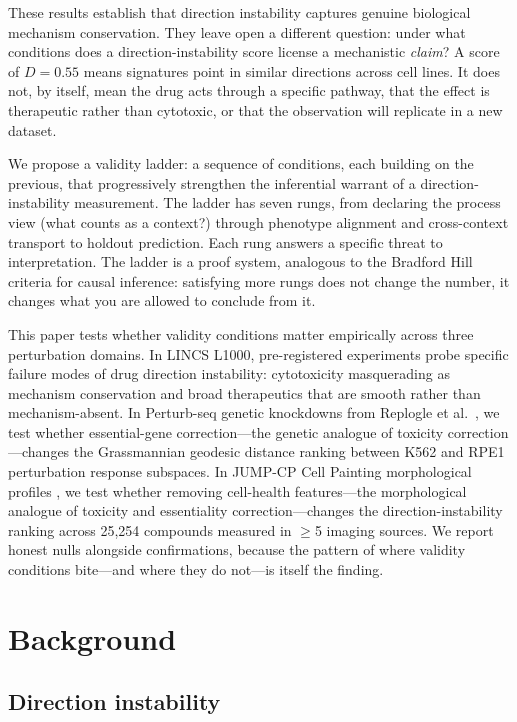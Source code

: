 \documentclass{article}
\begin{document}
These results establish that direction instability captures genuine biological
mechanism conservation. They leave open a different question: under what
conditions does a direction-instability score license a mechanistic \emph{claim}?
A score of $D = 0.55$ means signatures point in similar directions across cell
lines. It does not, by itself, mean the drug acts through a specific pathway,
that the effect is therapeutic rather than cytotoxic, or that the observation
will replicate in a new dataset.

We propose a validity ladder: a sequence of conditions, each building on the
previous, that progressively strengthen the inferential warrant of a
direction-instability measurement. The ladder has seven rungs, from declaring
the process view (what counts as a context?) through phenotype alignment and
cross-context transport to holdout prediction. Each rung answers a specific
threat to interpretation. The ladder is a proof system, analogous to the
Bradford Hill criteria for causal inference: satisfying more rungs does not
change the number, it changes what you are allowed to conclude from it.

This paper tests whether validity conditions matter empirically across three
perturbation domains. In LINCS L1000, pre-registered experiments probe
specific failure modes of drug direction instability: cytotoxicity
masquerading as mechanism conservation and broad therapeutics that are
smooth rather than mechanism-absent. In Perturb-seq genetic knockdowns from
Replogle et al.\ \citep{replogle2022mapping}, we test whether essential-gene
correction---the genetic analogue of toxicity correction---changes the
Grassmannian geodesic distance ranking between K562 and RPE1 perturbation
response subspaces. In JUMP-CP Cell Painting morphological profiles
\citep{chandrasekaran2023jump}, we test whether removing cell-health
features---the morphological analogue of toxicity and essentiality
correction---changes the direction-instability ranking across 25{,}254
compounds measured in $\geq$5 imaging sources. We report honest nulls
alongside confirmations, because the pattern of where validity conditions
bite---and where they do not---is itself the finding.

\section{Background}

\subsection{Direction instability}
\end{document}
